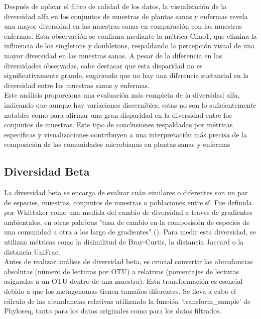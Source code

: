 Después de aplicar el filtro de calidad de los datos, la visualización de la diversidad alfa en los conjuntos de muestras de plantas sanas y enfermas revela una mayor diversidad en las muestras sanas en comparación con las muestras enfermas. Esta observación se confirma mediante la métrica Chao1, que elimina la influencia de los singletons y doubletons, respaldando la percepción visual de una mayor diversidad en las muestras sanas. A pesar de la diferencia en las diversidades observadas, cabe destacar que esta disparidad no es significativamente grande, sugiriendo que no hay una diferencia sustancial en la diversidad entre las muestras sanas y enfermas.\\

Este análisis proporciona una evaluación más completa de la diversidad alfa, indicando que aunque hay variaciones discernibles, estas no son lo suficientemente notables como para afirmar una gran disparidad en la diversidad entre los conjuntos de muestras. Este tipo de conclusiones respaldadas por métricas específicas y visualizaciones contribuyen a una interpretación más precisa de la composición de las comunidades microbianas en plantas sanas y enfermas\\

\subsection{Diversidad Beta}
La diversidad beta se encarga de evaluar cuán similares o diferentes son un par de especies, muestras, conjuntos de muestras o poblaciones entre sí. Fue definida por Whittaker como una medida del cambio de diversidad a traves de gradientes ambientales, en otras palabras "tasa de cambio en la composisión de especies de una comunidad a otra a los largo de gradientes" (\cite{whittaker1960}). Para medir esta diversidad, se utilizan métricas como la disimilitud de Bray-Curtis, la distancia Jaccard o la distancia UniFrac.\\

Antes de realizar análisis de diversidad beta, es crucial convertir las abundancias absolutas (número de lecturas por OTU) a relativas (porcentajes de lecturas asignadas a un OTU dentro de una muestra). Esta transformación es esencial debido a que los metagenomas tienen tamaños diferentes. Se lleva a cabo el cálculo de las abundancias relativas utilizando la función 'transform\_sample' de Phyloseq, tanto para los datos originales como para los datos filtrados.\\

